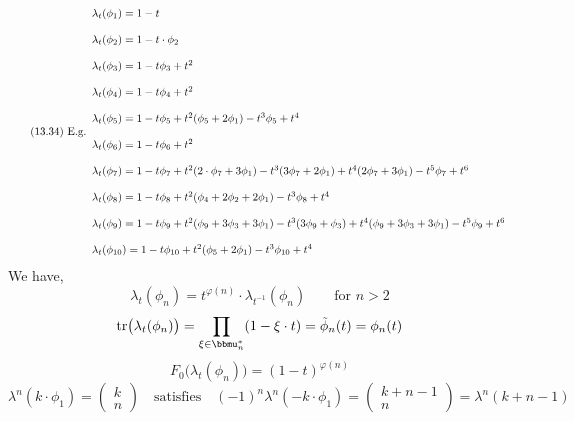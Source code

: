 \documentclass[leqno]{article}
\numberwithin{equation}{section}
\begin{document}
\begin{equation}
  \label{eq:13.35}
\tag*{(13.34) E.g.} \stepcounter{equation}
  \begin{array}[h]{l}
    \lambda_t(\phi_1)=1-t \\\\
    \lambda_t(\phi_2) = 1-t\cdot \phi_2 \\\\
    \lambda_t(\phi_3) = 1 - t\phi_3+t^2 \\\\
    \lambda_t(\phi_4) = 1-t\phi_4+t^2 \\\\
    \lambda_t(\phi_5)=1-t\phi_5+t^2(\phi_5+2\phi_1)-t^3\phi_5+t^4 \\\\
    \lambda_t(\phi_6)=1-t\phi_6+t^2 \\\\
    \lambda_t(\phi_7)=1-t\phi_7+t^2(2\cdot\phi_7+3\phi_1)-t^3(3\phi_7+2\phi_1)+t^4(2\phi_7+3\phi_1)-t^5\phi_7+t^6 \\\\
    \lambda_t(\phi_8)=1-t\phi_8+t^2(\phi_4+2\phi_2+2\phi_1)-t^3\phi_8+t^4 \\\\
    \lambda_t(\phi_9)=1-t\phi_9+t^2(\phi_9+3\phi_3+3\phi_1)-t^3(3\phi_9+\phi_3)+t^4(\phi_9+3\phi_3+3\phi_1)-t^5\phi_9+t^6 \\\\
    \lambda_t(\phi_{10})=1-t\phi_{10}+t^2(\phi_5+2\phi_1)-t^3\phi_{10}+t^4
  \end{array}
\end{equation}
We have,
\begin{equation}
  \label{eq:13.36}
  \lambda_t(\phi_n)=t^{\varphi(n)}\cdot \lambda_{t^{-1}}(\phi_n)\qquad \text{for $n>2$}
\end{equation}
\begin{equation}
  \label{eq:13.37}
  \text{tr}\big(\lambda_t(\phi_n)\big) = \prod\limits_{\xi\in\bbmu_n^*} (1-\xi\cdot t) = \tilde{\phi}_n(t)=\phi_n(t)
\end{equation}
\begin{equation}
  \label{eq:13.38}
  F_0\big(\lambda_t(\phi_n)\big)=(1-t)^{\varphi(n)}
\end{equation}
\begin{equation}
  \label{eq:13.39}
  \lambda^n(k\cdot\phi_1) = \begin{pmatrix} k \\ n  \end{pmatrix} \quad \text{satisfies}\quad (-1)^n\lambda^n(-k\cdot
  \phi_1) =  \begin{pmatrix} k+n-1 \\ n  \end{pmatrix} = \lambda^n(k+n-1)
\end{equation}
\end{document}
